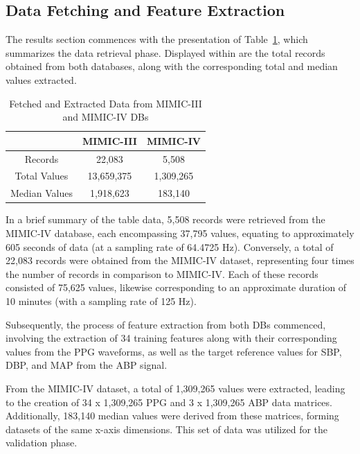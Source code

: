 \subsection{Data Fetching and Feature Extraction}
\label{subsec:results_data}

The results section commences with the presentation of Table~\ref{tab:records}, which summarizes the data retrieval phase.
Displayed within are the total records obtained from both databases, along with the corresponding total and median values extracted.

\begin{table}[h]
    \renewcommand{\arraystretch}{1.5}
    \setlength{\tabcolsep}{12pt}
    \begin{center}
        \begin{tabular}{ |c|c|c| }
            \hline
            & MIMIC-III  & MIMIC-IV  \\
            \hline
            Records       & 22,083     & 5,508     \\
            \hline
            Total Values  & 13,659,375 & 1,309,265 \\
            \hline
            Median Values & 1,918,623  & 183,140   \\
            \hline
        \end{tabular}
    \end{center}
    \captionsetup{format=plain, justification=centering}
    \caption{Fetched and Extracted Data from MIMIC-III and MIMIC-IV DBs}
    \label{tab:records}
\end{table}

In a brief summary of the table data, 5,508 records were retrieved from the MIMIC-IV database, each encompassing 37,795 values, equating to approximately 605 seconds of data (at a sampling rate of 64.4725 Hz).
Conversely, a total of 22,083 records were obtained from the MIMIC-IV dataset, representing four times the number of records in comparison to MIMIC-IV\@.
Each of these records consisted of 75,625 values, likewise corresponding to an approximate duration of 10 minutes (with a sampling rate of 125 Hz).

Subsequently, the process of feature extraction from both DBs commenced, involving the extraction of 34 training features along with their corresponding values from the PPG waveforms,
as well as the target reference values for SBP, DBP, and MAP from the ABP signal.

From the MIMIC-IV dataset, a total of 1,309,265 values were extracted, leading to the creation of 34 x 1,309,265 PPG and 3 x 1,309,265 ABP data matrices.
Additionally, 183,140 median values were derived from these matrices, forming datasets of the same x-axis dimensions.
This set of data was utilized for the validation phase.

